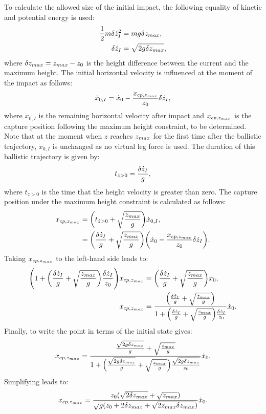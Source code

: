 To calculate the allowed size of the initial impact, the following equality of kinetic and potential energy is used:
\begin{align}
 	\frac{1}{2}m\delta \dot{z}_I^2 &= mg\delta z_{max},\\
 	\delta \dot{z}_I &= \sqrt{2g\delta z_{max}}, 
\end{align}
where $\delta z_{max}=z_{max}-z_0$ is the height difference between the current and the maximum height. The initial horizontal velocity is influenced at the moment of the impact as follows:
\begin{equation}\label{eq:dotximpact}
	\dot{x}_{0,I} = \dot{x}_0-\frac{x_{cp,z_{max}}}{z_0}\delta \dot{z}_I,
\end{equation}
where $\dot{x}_{0,I}$ is the remaining horizontal velocity after impact and $x_{cp,z_{max}}$ is the capture position following the maximum height constraint, to be determined. Note that at the moment when $z$ reaches $z_{max}$ for the first time after the ballistic trajectory, $\dot{x}_{0,I}$ is unchanged as no virtual leg force is used. The duration of this ballistic trajectory is given by:
\begin{equation}
	t_{\dot{z}>0} =\frac{\delta \dot{z}_I}{g},
\end{equation}
where $t_{\dot{z}>0}$ is the time that the height velocity is greater than zero. The capture position under the maximum height constraint is calculated as follows:
\begin{align}
	x_{cp,z_{max}}&=\bigg(t_{\dot{z}>0}+\sqrt{\frac{z_{max}}{g}}\bigg)\dot{x}_{0,I},\\
			&=\bigg(\frac{\delta \dot{z}_I}{g}+\sqrt{\frac{z_{max}}{g}}\bigg)\bigg(\dot{x}_0-\frac{x_{cp,z_{max}}}{z_0}\delta \dot{z}_I\bigg).
\end{align}
Taking $x_{cp,z_{max}}$ to the left-hand side leads to:
\begin{align}
	 \Bigg(1+\bigg(\frac{\delta \dot{z}_I}{g}+\sqrt{\frac{z_{max}}{g}}\bigg)\frac{\delta \dot{z}_I}{z_0}\Bigg)x_{cp,z_{max}}& =		\bigg(\frac{\delta \dot{z}_I}{g}+\sqrt{\frac{z_{max}}{g}}\bigg)\dot{x}_0,\\
	 x_{cp,z_{max}} & = \frac{\Big(\frac{\delta \dot{z}_I}{g}+\sqrt{\frac{z_{max}}{g}}\Big)}{ 1+\Big(\frac{\delta \dot{z}_I}{g}+\sqrt{\frac{z_{max}}{g}}\Big)\frac{\delta \dot{z}_I}{z_0}}\dot{x}_0.
\end{align}
Finally, to write the point in terms of the initial state gives:
\begin{equation}
 x_{cp,z_{max}}  = \frac{\frac{\sqrt{2g\delta z_{max}}}{g}+\sqrt{\frac{z_{max}}{g}}}{ 1+\Big(\frac{\sqrt{2g\delta z_{max}}}{g}+\sqrt{\frac{z_{max}}{g}}\Big)\frac{\sqrt{2g\delta z_{max}}}{z_0}}\dot{x}_0.
\end{equation}
Simplifying leads to:
\begin{equation}
	 x_{cp,z_{max}} = \frac{z_0(\sqrt{2\delta{z_{max}}}+\sqrt{z_{max}})}{\sqrt{g}(z_0 + 2\delta{z_{max}} + \sqrt{2z_{max}\delta{z_{max}}})}\dot{x}_0.
\end{equation}
